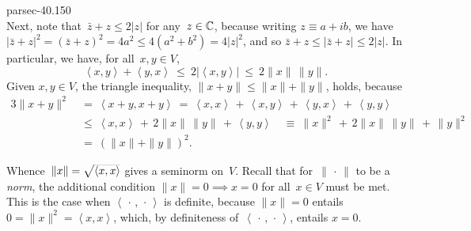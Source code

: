 \documentclass[b5page]{book}
\begin{document}
\begin{solution}{parsec-40.150}
\begin{equation*}
    \end{equation*}
Next, note that~$\bar{z}+z \leq 2\left|z\right|$ for any~$z\in\mathbb{C}$,
    because writing $z\equiv a+ib$,
    we have $\left|\bar{z}+z\right|^2=(\bar{z}+z)^2 = 4a^2 \leq 4(a^2 + b^2) = 4\left|z\right|^2$,
    and so $\bar{z}+z \leq \left|\bar{z}+z\right|\leq 2\left|z\right|$.
In particular, we have,
for all~$x,y\in V$,
\begin{equation*}
\left<x,y\right>+\left<y,x\right>
\ \leq\  2\left|\left<x,y\right>\right|\ \leq\ 
2 \|x\|\,\|y\|.
\end{equation*}
Given $x,y\in V$,
the triangle inequality,
$\|x+y\|\leq \|x\|+\|y\|$,
holds,
because
\begin{alignat*}{3}
    \|x+y\|^2\ &=\ 
    \left<x+y,x+y\right> 
    \ =\ \left<x,x\right>\,+\,
    \left<x,y\right>\,+\,
    \left<y,x\right>\,+\,
    \left<y,y\right> \\
    &\leq \ \left<x,x\right>\,+\,
    2\|x\|\,\|y\|
    \,+\,
    \left<y,y\right>  
    \quad\equiv\ 
    \|x\|^2 \,+\, 2\|x\|\,\|y\| \,+\, \|y\|^2\\
    \ &=\   (\|x\|+\|y\|)^2.
\end{alignat*}

Whence~$\|x\|=\smash{\sqrt{\left<x,x\right>}}$ gives
a seminorm on~$V$.
Recall that for~$\|\,\cdot\,\|$ to be a \emph{norm},
the additional condition
$\|x\|=0\implies x=0$
for all~$x\in V$
must be met.
This is the case when
$\left<\,\cdot\,,\,\cdot\,\right>$
is definite,
because 
$\|x\|=0$
entails $0=\|x\|^2=\left<x,x\right>$,
which, by definiteness of~$\left<\,\cdot\,,\,\cdot\,\right>$,
entails $x=0$.


\end{solution}
\end{document}
